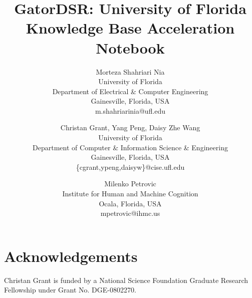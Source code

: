 \documentclass{article}
\begin{document}
\title{GatorDSR: University of Florida Knowledge Base Acceleration Notebook}


\author {%
  Morteza Shahriari Nia\\
  University of Florida\\
  Department of Electrical \& Computer Engineering\\
  Gainesville, Florida, USA\\
       {m.shahriarinia@ufl.edu}
\and
  Christan Grant, Yang Peng, Daisy Zhe Wang\\
  University of Florida\\
       Department of Computer \& Information Science \& Engineering\\
       Gainesville, Florida, USA\\
       {\{cgrant,ypeng,daisyw\}@cise.ufl.edu}
\and
  Milenko Petrovic\\
  Institute for Human and Machine Cognition\\
       Ocala, Florida, USA\\
       {mpetrovic@ihmc.us}
}

\maketitle
















\section*{Acknowledgements}
Christan Grant is funded by a National Science Foundation Graduate Research
Fellowship under Grant No. DGE-0802270. 

%
%



\end{document}
